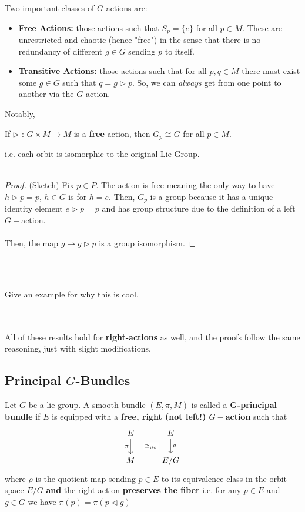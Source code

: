 \documentclass[11pt]{article}
\begin{document}
Two important classes of $G$-actions are:
\begin{itemize}
    \item \textbf{Free Actions:} those actions such that $S_p = \{e\}$ for all $p \in M$. These are unrestricted and chaotic (hence "free") in the sense that there is no redundancy of different $g \in G$ sending $p$ to itself.
    \item \textbf{Transitive Actions: } those actions such that for all $p, q \in M$ there must exist some $g \in G$ such that $q = g \triangleright p$. So, we can \emph{always} get from one point to another via the $G$-action.
\end{itemize}

Notably,
\begin{theorem}
    If $\triangleright \text{ : } G \times M \rightarrow M$ is a \textbf{free} action, then $G_p \cong G$ for all $p \in M$.
\end{theorem}
i.e. each orbit is isomorphic to the original Lie Group.
\\
\\
\begin{proof}
    (Sketch) Fix $p \in P$. The action is free meaning the only way to have $h \triangleright p = p$, $h \in G$ is for $h = e$. Then, $G_p$ is a group because it has a unique identity element $e \triangleright p = p$ and has group structure due to the definition of a left $G-$action.
    \\
    \\
    Then, the map $g \mapsto g \triangleright p$ is a group isomorphism.
\end{proof}
\\
\\
\begin{thought}
    {Give an example for why this is cool.}
\end{thought}
\\
\\
All of these results hold for \textbf{right-actions} as well, and the proofs follow the same reasoning, just with slight modifications.

\vskip 0.5cm
\subsection{Principal $G$-Bundles}

\begin{definition}
    Let $G$ be a lie group. A smooth bundle $(E, \pi, M)$ is called a \textbf{G-principal bundle} if $E$ is equipped with a \textbf{free, right (not left!) $G-$action} such that \[\begin{tikzcd}
	E & E \\
	M & {E/G}
	\arrow[""{name=0, anchor=center, inner sep=0}, "\pi"', from=1-1, to=2-1]
	\arrow[""{name=1, anchor=center, inner sep=0}, "\rho", from=1-2, to=2-2]
	\arrow["{\cong_{\text{iso}}}"{description}, draw=none, from=0, to=1]
\end{tikzcd}\] where $\rho$ is the quotient map sending $p \in E$ to its equivalence class in the orbit space $E/G$ \textbf{and} the right action \textbf{preserves the fiber} i.e. for any $p \in E$ and $g \in G$ we have $\pi(p) = \pi(p \triangleleft g)$
\end{definition}
\end{document}

